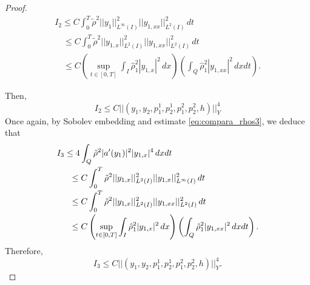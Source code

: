 \documentclass[11pt,a4paper]{amsart}
\numberwithin{equation}{section}
\begin{document}
\begin{proof}
    $$
    \begin{array}{l}
        \displaystyle 	I_{2}\leq  C\int_{0}^{T}\tilde{\rho}^{2}||y_{1}||^{2}_{L^{\infty}(I)}||y_{1,xx}||^{2}_{L^{2}(I)}\,dt\\[1.0em]
        
        \displaystyle \quad	\leq C \int_{0}^{T}\tilde{\rho}^{2}||y_{1,x}||^{2}_{L^{2}(I)}||y_{1,xx}||^{2}_{L^{2}(I)}\,dt\\[1.0em]
    
        \displaystyle \quad\leq C \left(  \sup_{t\in [0,T]}\int_{I}\hat{\rho}^{2}_{1}|y_{1,x}|^{2}\,dx \right)  \left( \int_{Q}\hat{\rho}^{2}_{1}|y_{1,xx}|^{2}\,dxdt \right).
    \end{array}
    $$
    
    \noindent Then,
    \begin{equation}\label{lemma-eq5}
        I_{2}\leq C ||(y_1,y_2,p^1_1,p^1_2,p^2_1,p^2_2,h)||^{4}_{Y}
    \end{equation}   	Once again, by Sobolev embedding  and estimate  \eqref{eq:compara_rhos3}, we deduce that
    $$
    \begin{array}{l}
    \displaystyle I_{3} \leq 4 \int_{Q}\tilde{\rho}^{2}|a'(y_{1})|^{2}|y_{1,x}|^{4}\,dxdt\\
      \noalign{\smallskip}\phantom{AA}
    \displaystyle \leq C \int_{0}^{T}\tilde{\rho}^{2}||y_{1,x}||^{2}_{L^{2}(I)}||y_{1,x}||^{2}_{L^{\infty}(I)}\,dt\\
      \noalign{\smallskip}\phantom{AA}
    \displaystyle \leq C \int_{0}^{T}\tilde{\rho}^{2}||y_{1,x}||^{2}_{L^{2}(I)}||y_{1,xx}||^{2}_{L^{2}(I)}\,dt\\
      \noalign{\smallskip}\phantom{AA}
    \displaystyle \leq C \left(\sup_{t\in [0,T]}\int_{I}\hat{\rho}^{2}_{1}|y_{1,x}|^{2}\,dx  \right)\left( \int_{Q}\hat{\rho}^{2}_{1}|y_{1,xx}|^{2}\,dxdt\right).
        \end{array}
    $$
    Therefore,
    \begin{equation}\label{lemma-eq6}
        I_{3}\leq C ||(y_1,y_2,p^1_1,p^1_2,p^2_1,p^2_2,h)||^{4}_{Y}.
    \end{equation}
    

\end{proof}
\end{document}
